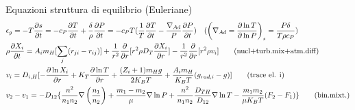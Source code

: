 \begin{frame}{Equazioni struttura di equilibrio (Euleriane)}
\begin{align*}
&\epsilon_g=-T\PDy{t}{s}=-c_P\PDy{t}{T}+\frac{\delta}{\rho}\PDy{t}{P}=-c_PT(\frac{1}{T}\PDy{t}{T}-\frac{\nabla_{Ad}}{P}\PDy{t}{P})\quad(\left(\nabla_{Ad}=\PDly{P}{T}\right)_s=\frac{P\delta}{T\rho c_P})\\
&\rho\PDy{t}{X_i}=A_im_H[\sum_j(r_{ji}-r_{ij})]+\frac{1}{r^2}\PDof{r}[r^2\rho D_T\PDy{r}{X_i}]-\frac{1}{r^2}\PDof{r}[r^2\rho v_i]\tag{nucl+turb.mix+atm.diff}\\
&v_i=D_{i,H}[-\PDy{r}{\ln{X_i}}+K_T\PDy{r}{\ln{T}}+\frac{(Z_i+1)m_Hg}{2K_BT}+\frac{A_im_H}{K_BT}(g_{rad,i}-g)]\tag{trace el. i}\\
&v_2-v_1=-D_{12}\{\frac{n^2}{n_1n_2}\nabla\left(\frac{n_1}{n_2}\right)+\frac{m_1-m_2}{\mu}\nabla\ln{P}+\frac{n^2}{n_1n_2}\frac{D_{TH}}{D_{12}}\nabla\ln{T}-\frac{m_1m_2}{\mu K_BT}(F_2-F_1)\}\tag{bin.mixt.}
\end{align*}
\end{frame}

